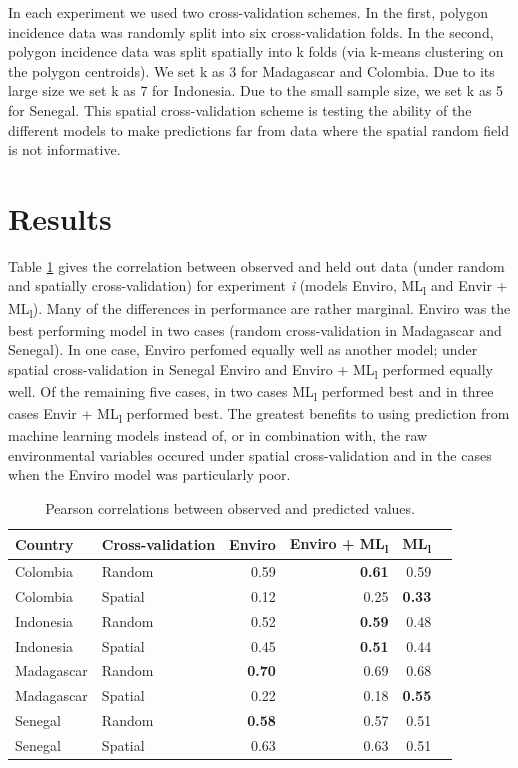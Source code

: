 \documentclass[review]{elsarticle}
\begin{document}
In each experiment we used two cross-validation schemes. 
In the first, polygon incidence data was randomly split into six cross-validation folds.
In the second, polygon incidence data was split spatially into k folds (via k-means clustering on the polygon centroids).
We set k as 3 for Madagascar and Colombia.
Due to its large size we set k as 7 for Indonesia.
Due to the small sample size, we set k as 5 for Senegal.
This spatial cross-validation scheme is testing the ability of the different models to make predictions far from data where the spatial random field is not informative.




\section{Results}



Table \ref{t:results} gives the correlation between observed and held out data (under random and spatially cross-validation) for experiment \emph{i} (models Enviro, ML\textsubscript{l} and Envir + ML\textsubscript{l}).
Many of the differences in performance are rather marginal.
Enviro was the best performing model in two cases (random cross-validation in Madagascar and Senegal).
In one case, Enviro perfomed equally well as another model; under spatial cross-validation in Senegal Enviro and Enviro + ML\textsubscript{l} performed equally well.
Of the remaining five cases, in two cases ML\textsubscript{l} performed best and in three cases Envir + ML\textsubscript{l} performed best.
The greatest benefits to using prediction from machine learning models instead of, or in combination with, the raw environmental variables occured under spatial cross-validation and in the cases when the Enviro model was particularly poor.

\begin{table}[t!]
\caption{Pearson correlations between observed and predicted values. }
\centering
\begin{tabular}{llrrrr}
Country &  Cross-validation & Enviro &  Enviro + ML\textsubscript{l} &  ML\textsubscript{l} \\
\hline 
 Colombia & Random &  0.59 & \textbf{0.61}& 0.59  \\
 Colombia &  Spatial &  0.12 &  0.25&  \textbf{0.33} \\
 Indonesia &  Random &  0.52 &  \textbf{0.59}&  0.48  \\
 Indonesia &  Spatial &  0.45 &  \textbf{0.51}&  0.44  \\
 Madagascar & Random &   \textbf{0.70}& 0.69 &  0.68  \\
 Madagascar &  Spatial &  0.22 & 0.18&  \textbf{0.55} \\
 Senegal &  Random &  \textbf{0.58} & 0.57&  0.51  \\
 Senegal &  Spatial &  0.63 &  0.63&  0.51  \\
\end{tabular}
\label{t:results}
\end{table}
\end{document}
